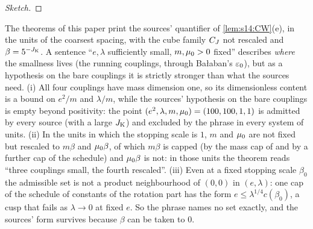 \begin{proof}[Sketch]
\end{proof}

\begin{remark}\label{rem:s14:quantifier}
The theorems of this paper print the sources' quantifier of \cref{lem:s14:CW}(e), in the units of the coarsest spacing, with the cube family $C_J$ not rescaled and $\beta=5^{-J_{\rm K}}$. A sentence ``$e,\lambda$ sufficiently small, $m,\mu_0>0$ fixed'' describes \emph{where} the smallness lives (the running couplings, through Ba{\l}aban's $\varepsilon_0$), but as a hypothesis on the bare couplings it is strictly stronger than what the sources need. (i) All four couplings have mass dimension one, so its dimensionless content is a bound on $e^2/m$ and $\lambda/m$, while the sources' hypothesis on the bare couplings is empty beyond positivity: the point $(e^2,\lambda,m,\mu_0)=(100,100,1,1)$ is admitted by every source (with a large $J_{\rm K}$) and excluded by the phrase in every system of units. (ii) In the units in which the stopping scale is $1$, $m$ and $\mu_0$ are not fixed but rescaled to $m\beta$ and $\mu_0\beta$, of which $m\beta$ is capped (by the mass cap of \cite[Prop.~3.1]{Ba2} and by a further cap of the schedule) and $\mu_0\beta$ is not: in those units the theorem reads ``three couplings small, the fourth rescaled''. (iii) Even at a fixed stopping scale $\beta_0$ the admissible set is not a product neighbourhood of $(0,0)$ in $(e,\lambda)$: one cap of the schedule of constants of the rotation part has the form $e\le\lambda^{1/4}c(\beta_0)$, a cusp that fails as $\lambda\to0$ at fixed $e$. So the phrase names no set exactly, and the sources' form survives because $\beta$ can be taken to $0$.
\end{remark}

